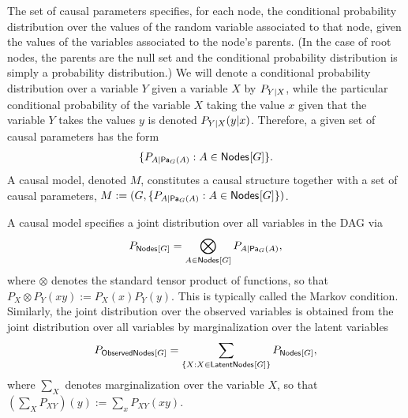 The set of causal parameters specifies, for each node, the conditional probability distribution over the values of the random variable associated to that node, given the values of the variables associated to the node's parents.  (In the case of root nodes, the parents are the null set and the conditional probability distribution is simply a probability distribution.)
We will denote a conditional probability distribution over a variable $Y$ given a variable $X$ by $\pfunc{Y|X}$, while the particular conditional probability of the variable $X$ taking the value $x$ given that the variable $Y$ takes the values $y$ is denoted $\pdf[Y|X]{y|x}$.    Therefore, a given set of causal parameters has the form
\begin{align}
 \{ \pfunc{A|\Pa[G]{A}} : A \in \SmallNamedFunction{Nodes}{G} \}.
\end{align}
A causal model, denoted $M$, constitutes a causal structure together with a set of causal parameters, $M := ( G,   \{ \pfunc{A|\Pa[G]{A}} : A \in \SmallNamedFunction{Nodes}{G} \})$.


A causal model specifies a joint distribution over all variables in the DAG via
\begin{align}\label{Markov}
P_{\SmallNamedFunction{Nodes}{G}} = \bigotimes_{A\in \SmallNamedFunction{Nodes}{G}} \pfunc{A|\Pa[G]{A}},
\end{align}
where $\otimes$ denotes the standard tensor product of functions, so that $P_X \otimes P_Y (xy) := P_X(x) P_Y(y)$.  This is typically called the Markov condition.
Similarly, the joint distribution over the observed variables is obtained from the joint distribution over all variables by marginalization over the latent variables 
\begin{align}\label{MarkovObserved}
P_{\SmallNamedFunction{ObservedNodes}{G}} =  \sum_{\{X :X \in\SmallNamedFunction{LatentNodes}{G}\}} P_{\SmallNamedFunction{Nodes}{G}},
\end{align}
where $\sum_X$ denotes marginalization over the variable $X$, so that $(\sum_X P_{XY})(y):= \sum_x P_{XY}(xy)$.

